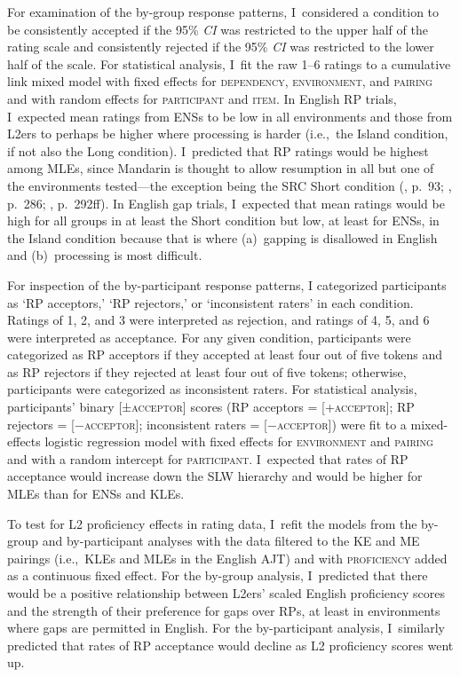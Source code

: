 For examination of the by-group response patterns, I~considered a condition to be consistently accepted if the 95\% \textit{CI} was restricted to the upper half of the rating scale and consistently rejected if the 95\% \textit{CI} was restricted to the lower half of the scale. For statistical analysis, I~fit the raw 1--6 ratings to a cumulative link mixed model with fixed effects for \textsc{dependency}, \textsc{environment}, and \textsc{pairing} and with random effects for \textsc{participant} and \textsc{item}. In English RP trials, I~expected mean ratings from ENSs to be low in all environments and those from L2ers to perhaps be higher where processing is harder (i.e.,~the Island condition, if not also the Long condition). I~predicted that RP ratings would be highest among MLEs, since Mandarin is thought to allow resumption in all but one of the environments tested---the exception being the SRC Short condition (\cite{keenan.comrie1977}, p.~93; \cite{li.wei2014}, p.~286; \cite{pan2016}, p.~292ff). In English gap trials, I~expected that mean ratings would be high for all groups in at least the Short condition but low, at least for ENSs, in the Island condition because that is where (a)~gapping is disallowed in English and (b)~processing is most difficult. 

For inspection of the by-participant response patterns, I categorized participants as `RP acceptors,' `RP rejectors,' or `inconsistent raters' in each condition. Ratings of 1, 2, and 3 were interpreted as rejection, and ratings of 4, 5, and 6 were interpreted as acceptance. For any given condition, participants were categorized as RP acceptors if they accepted at least four out of five tokens and as RP rejectors if they rejected at least four out of five tokens; otherwise, participants were categorized as inconsistent raters. For statistical analysis, participants' binary [\textsc{±acceptor}] scores (RP acceptors = [\textsc{+acceptor}]; RP rejectors = [\textsc{−acceptor}]; inconsistent raters = [\textsc{−acceptor}]) were fit to a mixed-effects logistic regression model with fixed effects for \textsc{environment} and \textsc{pairing} and with a random intercept for \textsc{participant}. I~expected that rates of RP acceptance would increase down the SLW hierarchy and would be higher for MLEs than for ENSs and KLEs.

To test for L2 proficiency effects in rating data, I~refit the models from the by-group and by-participant analyses with the data filtered to the KE and ME pairings (i.e.,~KLEs and MLEs in the English AJT) and with \textsc{proficiency} added as a continuous fixed effect. For the by-group analysis, I~predicted that there would be a positive relationship between L2ers' scaled English proficiency scores\footnotemark{} and the strength of their preference for gaps over RPs, at least in environments where gaps are permitted in English. For the by-participant analysis, I~similarly predicted that rates of RP acceptance would decline as L2 proficiency scores went up.

